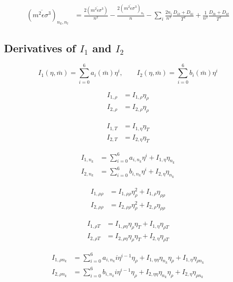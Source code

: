 \documentclass[internal,english]{sintefmemo2012}
\begin{document}
\begin{align}
  (\overline{m^2\epsilon\sigma^3})_{n_k,n_l} &= \frac{2(\overline{m^2\epsilon\sigma^3})}{n^2} - \frac{2(\overline{m^2\epsilon\sigma^3})_{n_l}}{n} - \sum_i \frac{2n_i}{n^3} \frac{D_{ik} + D_{ki}}{T^2} + \frac{1}{n^2} \frac{D_{lk} + D_{kl}}{T^2}
\end{align}

\subsection{Derivatives of $I_1$ and $I_2$}
\begin{equation}
  I_1(\eta,\bar m) = \sum_{i=0}^6 a_i(\bar m) \eta^i, \qquad  I_2(\eta,\bar m) = \sum_{i=0}^6 b_i(\bar m) \eta^i
\end{equation}

\begin{align}
  I_{1,\rho} &= I_{1,\rho} \eta_{\rho} \\
  I_{2,\rho} &= I_{2,\rho} \eta_{\rho}
\end{align}

\begin{align}
  I_{1,T} &= I_{1,\eta} \eta_{T} \\
  I_{2,T} &= I_{2,\eta} \eta_{T}
\end{align}

\begin{align}
  I_{1,n_k} &= \sum_{i=0}^6 a_{i,n_k} \eta^i + I_{1,\eta} \eta_{n_k} \\
  I_{2,n_k} &= \sum_{i=0}^6 b_{i,n_k} \eta^i + I_{2,\eta} \eta_{n_k}
\end{align}

\begin{align}
  I_{1,\rho\rho} &= I_{1,\rho \rho} \eta_{\rho}^2 + I_{1,\rho} \eta_{\rho\rho} \\
  I_{2,\rho\rho} &= I_{2,\rho \rho} \eta_{\rho}^2 + I_{2,\rho} \eta_{\rho\rho}
\end{align}

\begin{align}
  I_{1,\rho T} &= I_{1,\rho \eta} \eta_\rho \eta_T + I_{1,\eta} \eta_{\rho T} \\
  I_{2,\rho T} &= I_{2,\rho \eta} \eta_\rho \eta_T + I_{2,\eta} \eta_{\rho T}
\end{align}

\begin{align}
  I_{1,\rho n_k} &= \sum_{i=0}^6 a_{i,n_k} i \eta^{i-1} \eta_\rho + I_{1,\eta\eta} \eta_{n_k} \eta_\rho + I_{1,\eta} \eta_{\rho n_k} \\
  I_{2,\rho n_k} &= \sum_{i=0}^6 b_{i,n_k} i \eta^{i-1} \eta_\rho + I_{2,\eta\eta} \eta_{n_k} \eta_\rho + I_{2,\eta} \eta_{\rho n_k}
\end{align}
\end{document}
